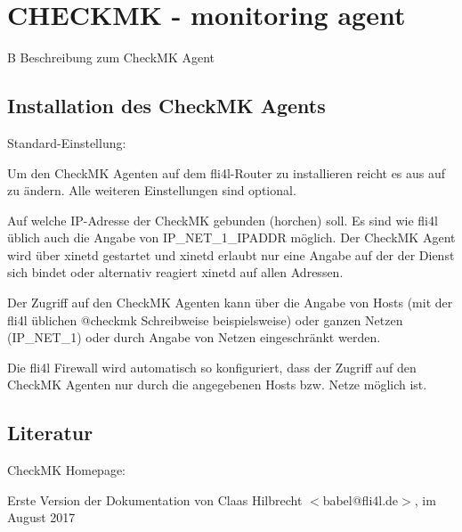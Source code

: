 \section {CHECKMK - monitoring agent}

B Beschreibung zum CheckMK Agent

\subsection {Installation des CheckMK Agents}

\begin{description}


  Standard-Einstellung: 

  Um den CheckMK Agenten auf dem fli4l-Router zu installieren reicht
  es aus  auf  zu ändern. Alle weiteren
  Einstellungen sind optional.


  Auf welche IP-Adresse der CheckMK gebunden (horchen) soll. Es sind
  wie fli4l üblich auch die Angabe von IP\_NET\_1\_IPADDR möglich. Der
  CheckMK Agent wird über xinetd gestartet und xinetd erlaubt nur eine
  Angabe auf der der Dienst sich bindet oder alternativ reagiert
  xinetd auf allen Adressen.


  Der Zugriff auf den CheckMK Agenten kann über die Angabe von Hosts
  (mit der fli4l üblichen @checkmk Schreibweise beispielsweise) oder
  ganzen Netzen (IP\_NET\_1) oder durch Angabe von Netzen
  eingeschränkt werden.

  Die fli4l Firewall wird automatisch so konfiguriert, dass der
  Zugriff auf den CheckMK Agenten nur durch die angegebenen Hosts
  bzw. Netze möglich ist.

\end{description}

\subsection{Literatur}
CheckMK Homepage: 

Erste Version der Dokumentation von
Claas Hilbrecht $<$babel@fli4l.de$>$, im August 2017
